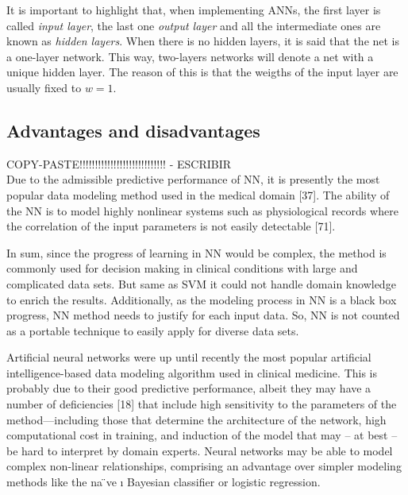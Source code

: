 It is important to highlight that, when implementing ANNs, the first layer is called \emph{input layer}, the last one \emph{output layer} and all the intermediate ones are known as \emph{hidden layers}. When there is no hidden layers, it is said that the net is a one-layer network. This way, two-layers networks will denote a net with a unique hidden layer. The reason of this is that the weigths of the input layer are usually fixed to $w=1$.

\subsection{Advantages and disadvantages}

\textsc{COPY-PASTE!!!!!!!!!!!!!!!!!!!!!!!!!!!! - ESCRIBIR}\\
Due to the admissible predictive performance of NN, it is presently the
most popular data modeling method used in the medical domain [37]. The ability of the NN is to model
highly nonlinear systems such as physiological records where the correlation of the input parameters is
not easily detectable [71].

In sum, since the progress of learning in NN would be complex, the method is commonly used for
decision making in clinical conditions with large and complicated data sets. But same as SVM it could
not handle domain knowledge to enrich the results. Additionally, as the modeling process in NN is a
black box progress, NN method needs to justify for each input data. So, NN is not counted as a portable
technique to easily apply for diverse data sets.

Artificial neural networks were up until recently the
most popular artificial intelligence-based data modeling
algorithm used in clinical medicine. This is probably due to
their good predictive performance, albeit they may have a
number of deficiencies [18] that include high sensitivity to the
parameters of the method—including those that determine
the architecture of the network, high computational cost in
training, and induction of the model that may – at best – be
hard to interpret by domain experts. Neural networks may be
able to model complex non-linear relationships, comprising
an advantage over simpler modeling methods like the na ̈ve
ı
Bayesian classifier or logistic regression.

